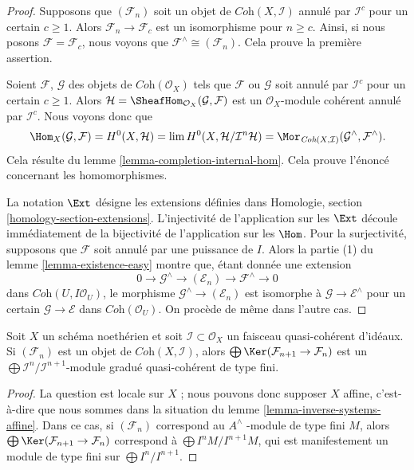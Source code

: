 \begin{proof}
Supposons que $(\mathcal{F}_n)$ soit un objet de $\textit{Coh}(X, \mathcal{I})$
annulé par $\mathcal{I}^c$ pour un certain $c \geq 1$. Alors
$\mathcal{F}_n \to \mathcal{F}_c$ est un isomorphisme pour $n \geq c$.
Ainsi, si nous posons $\mathcal{F} = \mathcal{F}_c$, nous voyons que
$\mathcal{F}^\wedge \cong (\mathcal{F}_n)$. Cela prouve la première assertion.

\medskip\noindent
Soient $\mathcal{F}$, $\mathcal{G}$ des objets de $\textit{Coh}(\mathcal{O}_X)$
tels que $\mathcal{F}$ ou $\mathcal{G}$ soit annulé par
$\mathcal{I}^c$ pour un certain $c \geq 1$. Alors
$\mathcal{H} = \SheafHom_{\mathcal{O}_X}(\mathcal{G}, \mathcal{F})$
est un $\mathcal{O}_X$-module cohérent annulé par $\mathcal{I}^c$.
Nous voyons donc que
$$
\Hom_X(\mathcal{G}, \mathcal{F}) =
H^0(X, \mathcal{H}) =
\lim H^0(X, \mathcal{H}/\mathcal{I}^n\mathcal{H}) =
\Mor_{\textit{Coh}(X, \mathcal{I})}
(\mathcal{G}^\wedge, \mathcal{F}^\wedge).
$$
Cela résulte du lemme \ref{lemma-completion-internal-hom}.
Cela prouve l'énoncé concernant les homomorphismes.

\medskip\noindent
La notation $\Ext$ désigne les extensions définies dans
Homologie, section \ref{homology-section-extensions}.
L'injectivité de l'application sur les $\Ext$ découle immédiatement de
la bijectivité de l'application sur les $\Hom$. Pour
la surjectivité, supposons que $\mathcal{F}$ soit annulé
par une puissance de $I$. Alors la partie (1) du lemme \ref{lemma-existence-easy}
montre que, étant donnée une extension
$$
0 \to \mathcal{G}^\wedge \to (\mathcal{E}_n) \to \mathcal{F}^\wedge \to 0
$$
dans $\textit{Coh}(U, I\mathcal{O}_U)$,
le morphisme $\mathcal{G}^\wedge \to (\mathcal{E}_n)$ est
isomorphe à $\mathcal{G} \to \mathcal{E}^\wedge$
pour un certain $\mathcal{G} \to \mathcal{E}$ dans $\textit{Coh}(\mathcal{O}_U)$.
On procède de même dans l'autre cas.
\end{proof}

\begin{lemma}
\label{lemma-finite-over-rees-algebra}
Soit $X$ un schéma noethérien et soit $\mathcal{I} \subset \mathcal{O}_X$
un faisceau quasi-cohérent d'idéaux. Si $(\mathcal{F}_n)$ est un objet de
$\textit{Coh}(X, \mathcal{I})$, alors
$\bigoplus \Ker(\mathcal{F}_{n + 1} \to \mathcal{F}_n)$ est
un
$\bigoplus \mathcal{I}^n/\mathcal{I}^{n + 1}$-module gradué quasi-cohérent de type fini.
\end{lemma}

\begin{proof}
La question est locale sur $X$ ; nous pouvons donc supposer $X$ affine, c'est-à-dire que
nous sommes dans la situation du lemme \ref{lemma-inverse-systems-affine}.
Dans ce cas, si $(\mathcal{F}_n)$ correspond au $A^\wedge$
-module de type fini $M$, alors $\bigoplus \Ker(\mathcal{F}_{n + 1} \to \mathcal{F}_n)$
correspond à $\bigoplus I^nM/I^{n + 1}M$, qui est manifestement un module de
type fini sur $\bigoplus I^n/I^{n + 1}$.
\end{proof}

